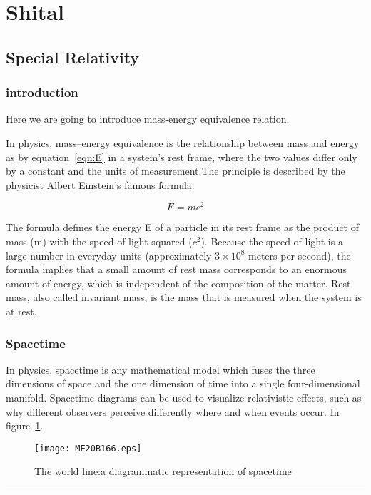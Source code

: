 \section{Shital}


\subsection{Special Relativity}

\subsubsection{introduction}

Here we are going to introduce mass-energy equivalence relation.

In physics, mass–energy equivalence is the relationship between mass and energy as by equation~\ref{eqn:E} in a system's rest frame, where the two values differ only by a constant and the units of measurement.The principle is described by the physicist Albert Einstein's famous formula.~\cite{Einstie}

\begin{equation}
	E=mc^2
	\label{eqn:E}
\end{equation}

The formula defines the energy E of a particle in its rest frame as the product of mass (m) with the speed of light squared ($c^2$). Because the speed of light is a large number in everyday units (approximately $3 \times 10 ^8$ meters per second), the formula implies that a small amount of rest mass corresponds to an enormous amount of energy, which is independent of the composition of the matter. Rest mass, also called invariant mass, is the mass that is measured when the system is at rest.


\subsubsection{Spacetime}

In physics, spacetime is any mathematical model which fuses the three dimensions of space and the one dimension of time into a single four-dimensional manifold. Spacetime diagrams can be used to visualize relativistic effects, such as why different observers perceive differently where and when events occur. In figure~\ref{f1:spacetime}.~\cite{Einstie}

\begin{figure}[h]
	\begin{center}
		\texttt{[image: ME20B166.eps]}
	\end{center}
	\caption{The world line:a diagrammatic representation of spacetime}
	\label{f1:spacetime}
\end{figure}

\hrule
